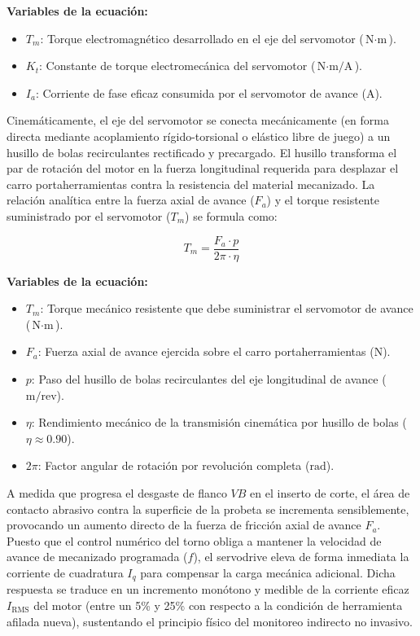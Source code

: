 \noindent\textbf{Variables de la ecuación:}
\begin{itemize}
    \item $T_m$: Torque electromagnético desarrollado en el eje del servomotor ($\text{N}\cdot\text{m}$).
    \item $K_t$: Constante de torque electromecánica del servomotor ($\text{N}\cdot\text{m/A}$).
    \item $I_a$: Corriente de fase eficaz consumida por el servomotor de avance ($\text{A}$).
\end{itemize}

Cinemáticamente, el eje del servomotor se conecta mecánicamente (en forma directa mediante acoplamiento rígido-torsional o elástico libre de juego) a un husillo de bolas recirculantes rectificado y precargado. El husillo transforma el par de rotación del motor en la fuerza longitudinal requerida para desplazar el carro portaherramientas contra la resistencia del material mecanizado. La relación analítica entre la fuerza axial de avance ($F_a$) y el torque resistente suministrado por el servomotor ($T_m$) se formula como:

\begin{equation}
T_m = \frac{F_a \cdot p}{2\pi \cdot \eta}
\label{eq:torque_avance_husillo}
\end{equation}

\noindent\textbf{Variables de la ecuación:}
\begin{itemize}
    \item $T_m$: Torque mecánico resistente que debe suministrar el servomotor de avance ($\text{N}\cdot\text{m}$).
    \item $F_a$: Fuerza axial de avance ejercida sobre el carro portaherramientas ($\text{N}$).
    \item $p$: Paso del husillo de bolas recirculantes del eje longitudinal de avance ($\text{m/rev}$).
    \item $\eta$: Rendimiento mecánico de la transmisión cinemática por husillo de bolas ($\eta \approx 0.90$).
    \item $2\pi$: Factor angular de rotación por revolución completa ($\text{rad}$).
\end{itemize}

A medida que progresa el desgaste de flanco $VB$ en el inserto de corte, el área de contacto abrasivo contra la superficie de la probeta se incrementa sensiblemente, provocando un aumento directo de la fuerza de fricción axial de avance $F_a$. Puesto que el control numérico del torno obliga a mantener la velocidad de avance de mecanizado programada ($f$), el servodrive eleva de forma inmediata la corriente de cuadratura $I_q$ para compensar la carga mecánica adicional. Dicha respuesta se traduce en un incremento monótono y medible de la corriente eficaz $I_{\text{RMS}}$ del motor (entre un 5\% y 25\% con respecto a la condición de herramienta afilada nueva), sustentando el principio físico del monitoreo indirecto no invasivo.

